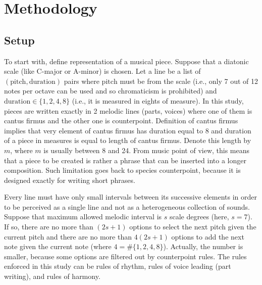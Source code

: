 \documentclass{article}
\begin{document}
\section{Methodology}
\label{sec:methodology}

\subsection{Setup}
\label{subsec:setup}

To start with, define representation of a musical piece. Suppose that a diatonic scale (like C-major or A-minor) is chosen. Let a line be a list of $(\mathrm{pitch}, \mathrm{duration})$ pairs where $\mathrm{pitch}$ must be from the scale (i.e., only 7 out of 12 notes per octave can be used and so chromaticism is prohibited) and $\mathrm{duration} \in \{1, 2, 4, 8\}$ (i.e., it is measured in eights of measure). In this study, pieces are written exactly in 2 melodic lines (parts, voices) where one of them is cantus firmus and the other one is counterpoint. Definition of cantus firmus implies that very element of cantus firmus has duration equal to 8 and duration of a piece in measures is equal to length of cantus firmus. Denote this length by $m$, where $m$ is usually between 8 and 24. From music point of view, this means that a piece to be created is rather a phrase that can be inserted into a longer composition. Such limitation goes back to species counterpoint, because it is designed exactly for writing short phrases.

Every line must have only small intervals between its successive elements in order to be perceived as a single line and not as a heterogeneous collection of sounds. Suppose that maximum allowed melodic interval is $s$ scale degrees (here, $s = 7$). If so, there are no more than $(2s + 1)$ options to select the next pitch given the current pitch and there are no more than $4(2s + 1)$ options to add the next note given the current note (where $4 = \#\{1, 2, 4, 8\}$). Actually, the number is smaller, because some options are filtered out by counterpoint rules. The rules enforced in this study can be rules of rhythm, rules of voice leading (part writing), and rules of harmony.
\end{document}
